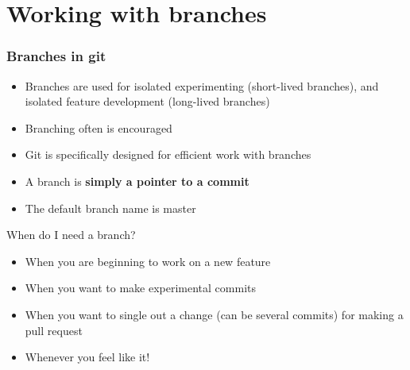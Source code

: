 \section{Working with branches}

\begin{frame}

\frametitle{Branches in git}
	
\begin{itemize}
	\item Branches are used for isolated experimenting (short-lived branches), and isolated feature development (long-lived branches)
	\item Branching often is encouraged
	\item Git is specifically designed for efficient work with branches
	\item A branch is \textbf{simply a pointer to a commit}
	\item The default branch name is \alert{master}
\end{itemize}	

\begin{block}{When do I need a branch?}
	\begin{itemize}
	\item When you are beginning to work on a new feature
	\item When you want to make experimental commits
	\item When you want to single out a change (can be several commits) for making a pull request
	\item Whenever you feel like it!
	\end{itemize}
\end{block}

\end{frame}


